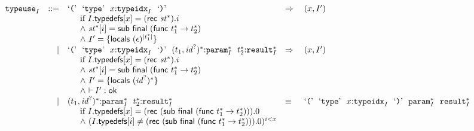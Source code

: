 $$
\begin{array}[t]{@{}lrrl@{}l@{}l@{}l@{}}
& {{\mathtt{typeuse}}}_{I} & ::= & \mbox{‘\texttt{{(}}’}~~\mbox{‘\texttt{type}’}~~x{:}{{\mathtt{typeidx}}}_{I}~~\mbox{‘\texttt{{)}}’} & \quad\Rightarrow\quad{} & (x, {I'}) &  \\
&&& \multicolumn{4}{@{}l@{}}{\quad
\quad
\begin{array}[t]{@{}l@{}}
\mbox{if}~ I{.}\mathsf{typedefs}{}[x] = (\mathsf{rec}~{{\mathit{st}}^\ast}) {.} i \\
{\land}~ {{\mathit{st}}^\ast}{}[i] = \mathsf{sub}~\mathsf{final}~(\mathsf{func}~{t_1^\ast} \rightarrow {t_2^\ast}) \\
{\land}~ {I'} = \{ \mathsf{locals}~{(\epsilon)^{{|{t_1^\ast}|}}} \} \\
\end{array}
} \\
& & | & \mbox{‘\texttt{{(}}’}~~\mbox{‘\texttt{type}’}~~x{:}{{\mathtt{typeidx}}}_{I}~~\mbox{‘\texttt{{)}}’}~~{(t_1, {{\mathit{id}}^?})^\ast}{:}{{{\mathtt{param}}}_{I}^\ast}~~{t_2^\ast}{:}{{{\mathtt{result}}}_{I}^\ast} & \quad\Rightarrow\quad{} & (x, {I'}) &  \\
&&& \multicolumn{4}{@{}l@{}}{\quad
\quad
\begin{array}[t]{@{}l@{}}
\mbox{if}~ I{.}\mathsf{typedefs}{}[x] = (\mathsf{rec}~{{\mathit{st}}^\ast}) {.} i \\
{\land}~ {{\mathit{st}}^\ast}{}[i] = \mathsf{sub}~\mathsf{final}~(\mathsf{func}~{t_1^\ast} \rightarrow {t_2^\ast}) \\
{\land}~ {I'} = \{ \mathsf{locals}~{({{\mathit{id}}^?})^\ast} \} \\
{\land}~ {\vdash}\, {I'} : \mathsf{ok} \\
\end{array}
} \\
& & | & {(t_1, {{\mathit{id}}^?})^\ast}{:}{{{\mathtt{param}}}_{I}^\ast}~~{t_2^\ast}{:}{{{\mathtt{result}}}_{I}^\ast} & \quad\equiv\quad{} & \mbox{‘\texttt{{(}}’}~~\mbox{‘\texttt{type}’}~~x{:}{{\mathtt{typeidx}}}_{I}~~\mbox{‘\texttt{{)}}’}~~{{{\mathtt{param}}}_{I}^\ast}~~{{{\mathtt{result}}}_{I}^\ast} &  \\
&&& \multicolumn{4}{@{}l@{}}{\quad
\quad
\begin{array}[t]{@{}l@{}}
\mbox{if}~ I{.}\mathsf{typedefs}{}[x] = (\mathsf{rec}~(\mathsf{sub}~\mathsf{final}~(\mathsf{func}~{t_1^\ast} \rightarrow {t_2^\ast}))) {.} 0 \\
{\land}~ (I{.}\mathsf{typedefs}{}[i] \neq (\mathsf{rec}~(\mathsf{sub}~\mathsf{final}~(\mathsf{func}~{t_1^\ast} \rightarrow {t_2^\ast}))) {.} 0)^{i<x} \\
\end{array}
} \\
\end{array}
$$

